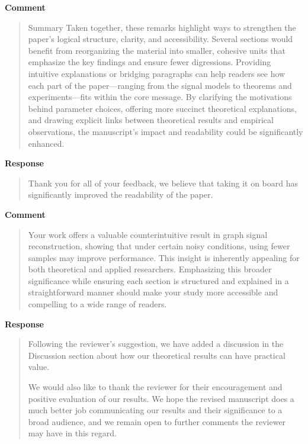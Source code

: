 \documentclass[11pt,onecolumn,journal]{IEEEtran}
\theoremstyle{definition}
\begin{document}
\textbf{Comment}
\begin{quote}
Summary
Taken together, these remarks highlight ways to strengthen the paper’s logical structure, clarity, and accessibility. Several sections would benefit from reorganizing the material into smaller, cohesive units that emphasize the key findings and ensure fewer digressions. Providing intuitive explanations or bridging paragraphs can help readers see how each part of the paper—ranging from the signal models to theorems and experiments—fits within the core message. By clarifying the motivations behind parameter choices, offering more succinct theoretical explanations, and drawing explicit links between theoretical results and empirical observations, the manuscript’s impact and readability could be significantly enhanced.
\end{quote}

\textbf{Response}
\begin{quote}
Thank you for all of your feedback, we believe that taking it on board has significantly improved the readability of the paper.
\end{quote}

\textbf{Comment}
\begin{quote}
Your work offers a valuable counterintuitive result in graph signal reconstruction, showing that under certain noisy conditions, using fewer samples may improve performance. This insight is inherently appealing for both theoretical and applied researchers. Emphasizing this broader significance while ensuring each section is structured and explained in a straightforward manner should make your study more accessible and compelling to a wide range of readers.
\end{quote}

\textbf{Response}
\begin{quote}
Following the reviewer's suggestion, we have added a discussion in the Discussion section about how our theoretical results can have practical value. 

We would also like to thank the reviewer for their encouragement and positive evaluation of our results. We hope the revised manuscript does a much better job communicating our results and their significance to a broad audience, and we remain open to further comments the reviewer may have in this regard.
\end{quote}


%

%
\end{document}
